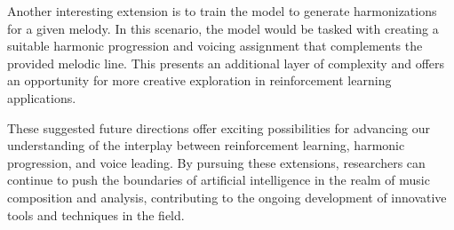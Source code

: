 \documentclass[12pt, letterpaper]{article}
\begin{document}
Another interesting extension is to train the model to generate harmonizations for a given melody. In this scenario, the model would be tasked with creating a suitable harmonic progression and voicing assignment that complements the provided melodic line. This presents an additional layer of complexity and offers an opportunity for more creative exploration in reinforcement learning applications.

These suggested future directions offer exciting possibilities for advancing our understanding of the interplay between reinforcement learning, harmonic progression, and voice leading. By pursuing these extensions, researchers can continue to push the boundaries of artificial intelligence in the realm of music composition and analysis, contributing to the ongoing development of innovative tools and techniques in the field.
\end{document}
